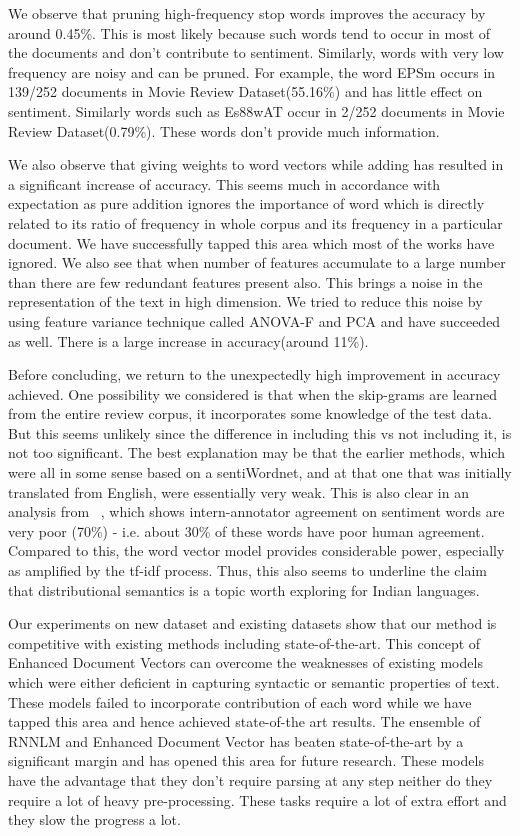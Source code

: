 \documentclass[11pt,a4paper]{article}
\begin{document}
We observe that pruning high-frequency stop words improves the accuracy by around 0.45\%. This is most likely  because such words tend to occur in most of the documents and don't contribute to sentiment.  Similarly, words with very low frequency are noisy and can be pruned. For example, the word {\dn EPSm} occurs in 139/252 documents in Movie Review Dataset(55.16\%) and has little effect on sentiment.
Similarly words such as {\dn Es\388wAT\0} occur in 2/252 documents in Movie Review Dataset(0.79\%). These words don't provide much information.

We also observe that giving weights to word vectors while adding has resulted in a significant increase of accuracy. This seems much in accordance with expectation as pure addition ignores the importance of word which is directly related to its ratio of frequency in whole corpus and its frequency in a particular document. We have successfully tapped this area which most of the works have ignored.
We also see that when number of features accumulate to a large number than there are few redundant features present also. This brings a noise in the representation of the text in high dimension. We tried to reduce this noise by using feature variance technique called ANOVA-F and PCA and have succeeded as well. There is a large increase in accuracy(around 11\%).

Before concluding, we return to the unexpectedly high improvement in accuracy achieved. One possibility we considered is that when the skip-grams are learned from the entire review corpus, it incorporates some knowledge of the test data.  But this seems unlikely since the difference in including this vs not including it, is not too significant.  The best explanation may be that the earlier methods, which were all in some sense based on a sentiWordnet, and at that one that was initially translated from English, were essentially very weak.  This is also clear in an analysis from
~\cite{Bakliwal:12}, which shows intern-annotator agreement on sentiment words are very poor (70\%) - i.e. about 30\% of these words have poor human agreement. Compared to this, the word vector model  
provides considerable power, especially as amplified by the tf-idf process. Thus, this also seems to underline the claim that distributional semantics is a topic worth exploring for Indian languages.

Our experiments on new dataset and existing datasets show that our method is competitive with existing methods including state-of-the-art. This concept of Enhanced Document Vectors can overcome the weaknesses of existing models which were either deficient in capturing syntactic or semantic properties of text. These models failed to incorporate contribution of each word while we have tapped this area and hence achieved state-of-the art results. The ensemble of RNNLM and Enhanced Document Vector has beaten state-of-the-art by a significant margin and has opened this area for future research. These models have the advantage that they don't require parsing at any step neither do they require a lot of heavy pre-processing. These tasks require a lot of extra effort and they slow the progress a lot.
\end{document}
